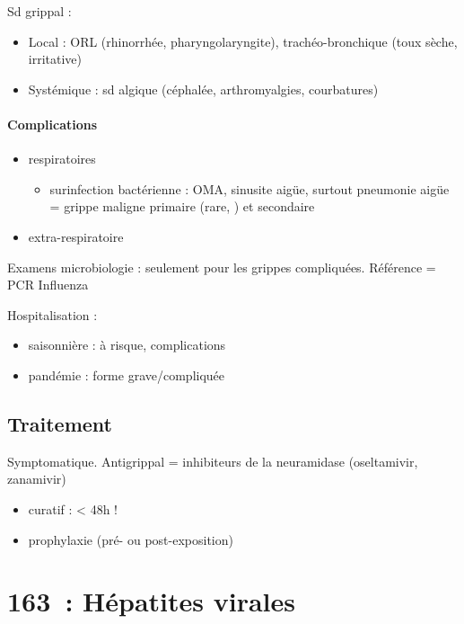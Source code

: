 Sd grippal :
\begin{itemize}
  \item 
    Local : ORL (rhinorrhée, pharyngolaryngite), trachéo-bronchique (toux sèche, irritative)
    \item Systémique : sd algique (céphalée, arthromyalgies, courbatures)
\end{itemize}

\paragraph{Complications}%
\label{par:complications}

\begin{itemize}
  \item respiratoires
    \begin{itemize}
      \item surinfection bactérienne : OMA, sinusite aigüe, surtout pneumonie aigüe =
        grippe maligne primaire (rare, $$) et secondaire
    \end{itemize}
  \item extra-respiratoire
\end{itemize}

Examens microbiologie : seulement pour les grippes compliquées. Référence = PCR
Influenza

Hospitalisation : 
\begin{itemize}
  \item saisonnière : à risque, complications
  \item pandémie : forme grave/compliquée
\end{itemize}

\subsection{Traitement}%

Symptomatique.
Antigrippal = inhibiteurs de la neuramidase (oseltamivir, zanamivir)
\begin{itemize}
  \item curatif : < 48h !
  \item prophylaxie (pré- ou post-exposition)
\end{itemize}

\section{163 : Hépatites virales}

